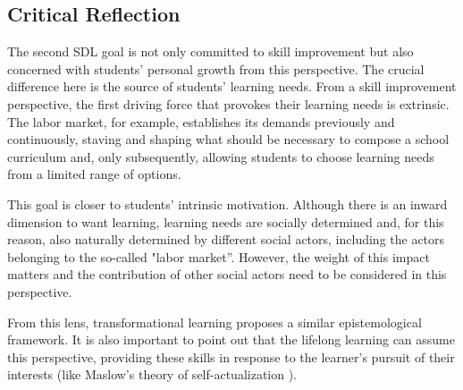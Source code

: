 
        


        

\subsection{Critical Reflection}
\label{sdl-goal-ss:reflection}

The second \gls{SDL} goal is not only committed to skill improvement but also concerned with students' personal growth from this perspective. The crucial difference here is the source of students’ learning needs. From a skill improvement perspective, the first driving force that provokes their learning needs is extrinsic. The labor market, for example, establishes its demands previously and continuously, staving and shaping what should be necessary to compose a school curriculum and, only subsequently, allowing students to choose learning needs from a limited range of options.

This goal is closer to students' intrinsic motivation. Although there is an inward dimension to want learning, learning needs are socially determined and, for this reason, also naturally determined by different social actors, including the actors belonging to the so-called "labor market”. However, the weight of this impact matters and the contribution of other social actors need to be considered in this perspective.


From this lens, transformational learning \cite{boyer:2006,vallance:2016} proposes a similar epistemological framework. It is also important to point out that the lifelong learning \cite{shen:2020,kastelan:2023} can assume this perspective, providing these skills in response to the learner’s pursuit of their interests (like Maslow's theory of self-actualization \cite{compton:2024}).

